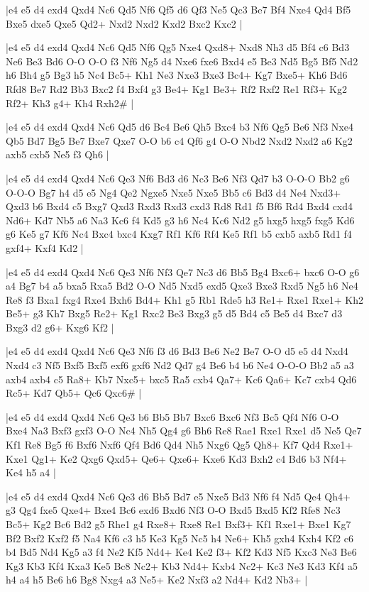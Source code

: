 \whitename{}
\blackname{}
\makegametitle
|e4 e5 d4 exd4 Qxd4 Nc6 Qd5 Nf6 Qf5 d6 Qf3 Ne5 Qc3 Be7 Bf4 Nxe4 Qd4 Bf5 Bxe5 dxe5 Qxe5 Qd2+ Nxd2 Nxd2 Kxd2 Bxc2 Kxc2  |

\whitename{}
\blackname{}
\makegametitle
|e4 e5 d4 exd4 Qxd4 Nc6 Qd5 Nf6 Qg5 Nxe4 Qxd8+ Nxd8 Nh3 d5 Bf4 c6 Bd3 Ne6 Be3 Bd6 O-O O-O f3 Nf6 Ng5 d4 Nxe6 fxe6 Bxd4 e5 Be3 Nd5 Bg5 Bf5 Nd2 h6 Bh4 g5 Bg3 h5 Nc4 Bc5+ Kh1 Ne3 Nxe3 Bxe3 Bc4+ Kg7 Bxe5+ Kh6 Bd6 Rfd8 Be7 Rd2 Bb3 Bxc2 f4 Bxf4 g3 Be4+ Kg1 Be3+ Rf2 Rxf2 Re1 Rf3+ Kg2 Rf2+ Kh3 g4+ Kh4 Rxh2\#  |

\whitename{}
\blackname{}
\makegametitle
|e4 e5 d4 exd4 Qxd4 Nc6 Qd5 d6 Bc4 Be6 Qh5 Bxc4 b3 Nf6 Qg5 Be6 Nf3 Nxe4 Qb5 Bd7 Bg5 Be7 Bxe7 Qxe7 O-O b6 c4 Qf6 g4 O-O Nbd2 Nxd2 Nxd2 a6 Kg2 axb5 cxb5 Ne5 f3 Qh6  |

\whitename{}
\blackname{}
\makegametitle
|e4 e5 d4 exd4 Qxd4 Nc6 Qe3 Nf6 Bd3 d6 Nc3 Be6 Nf3 Qd7 b3 O-O-O Bb2 g6 O-O-O Bg7 h4 d5 e5 Ng4 Qe2 Ngxe5 Nxe5 Nxe5 Bb5 c6 Bd3 d4 Ne4 Nxd3+ Qxd3 b6 Bxd4 c5 Bxg7 Qxd3 Rxd3 Rxd3 cxd3 Rd8 Rd1 f5 Bf6 Rd4 Bxd4 cxd4 Nd6+ Kd7 Nb5 a6 Na3 Kc6 f4 Kd5 g3 h6 Nc4 Kc6 Nd2 g5 hxg5 hxg5 fxg5 Kd6 g6 Ke5 g7 Kf6 Nc4 Bxc4 bxc4 Kxg7 Rf1 Kf6 Rf4 Ke5 Rf1 b5 cxb5 axb5 Rd1 f4 gxf4+ Kxf4 Kd2  |

\whitename{}
\blackname{}
\makegametitle
|e4 e5 d4 exd4 Qxd4 Nc6 Qe3 Nf6 Nf3 Qe7 Nc3 d6 Bb5 Bg4 Bxc6+ bxc6 O-O g6 a4 Bg7 b4 a5 bxa5 Rxa5 Bd2 O-O Nd5 Nxd5 exd5 Qxe3 Bxe3 Rxd5 Ng5 h6 Ne4 Re8 f3 Bxa1 fxg4 Rxe4 Bxh6 Bd4+ Kh1 g5 Rb1 Rde5 h3 Re1+ Rxe1 Rxe1+ Kh2 Be5+ g3 Kh7 Bxg5 Re2+ Kg1 Rxc2 Be3 Bxg3 g5 d5 Bd4 c5 Be5 d4 Bxc7 d3 Bxg3 d2 g6+ Kxg6 Kf2  |

\whitename{}
\blackname{}
\makegametitle
|e4 e5 d4 exd4 Qxd4 Nc6 Qe3 Nf6 f3 d6 Bd3 Be6 Ne2 Be7 O-O d5 e5 d4 Nxd4 Nxd4 c3 Nf5 Bxf5 Bxf5 exf6 gxf6 Nd2 Qd7 g4 Be6 b4 b6 Ne4 O-O-O Bb2 a5 a3 axb4 axb4 c5 Ra8+ Kb7 Nxc5+ bxc5 Ra5 cxb4 Qa7+ Kc6 Qa6+ Kc7 cxb4 Qd6 Rc5+ Kd7 Qb5+ Qc6 Qxc6\#  |

\whitename{}
\blackname{}
\makegametitle
|e4 e5 d4 exd4 Qxd4 Nc6 Qe3 b6 Bb5 Bb7 Bxc6 Bxc6 Nf3 Bc5 Qf4 Nf6 O-O Bxe4 Na3 Bxf3 gxf3 O-O Nc4 Nh5 Qg4 g6 Bh6 Re8 Rae1 Rxe1 Rxe1 d5 Ne5 Qe7 Kf1 Re8 Bg5 f6 Bxf6 Nxf6 Qf4 Bd6 Qd4 Nh5 Nxg6 Qg5 Qh8+ Kf7 Qd4 Rxe1+ Kxe1 Qg1+ Ke2 Qxg6 Qxd5+ Qe6+ Qxe6+ Kxe6 Kd3 Bxh2 c4 Bd6 b3 Nf4+ Ke4 h5 a4  |

\whitename{}
\blackname{}
\makegametitle
|e4 e5 d4 exd4 Qxd4 Nc6 Qe3 d6 Bb5 Bd7 e5 Nxe5 Bd3 Nf6 f4 Nd5 Qe4 Qh4+ g3 Qg4 fxe5 Qxe4+ Bxe4 Bc6 exd6 Bxd6 Nf3 O-O Bxd5 Bxd5 Kf2 Rfe8 Nc3 Bc5+ Kg2 Bc6 Bd2 g5 Rhe1 g4 Rxe8+ Rxe8 Re1 Bxf3+ Kf1 Rxe1+ Bxe1 Kg7 Bf2 Bxf2 Kxf2 f5 Na4 Kf6 c3 h5 Ke3 Kg5 Nc5 h4 Ne6+ Kh5 gxh4 Kxh4 Kf2 c6 b4 Bd5 Nd4 Kg5 a3 f4 Ne2 Kf5 Nd4+ Ke4 Ke2 f3+ Kf2 Kd3 Nf5 Kxc3 Ne3 Be6 Kg3 Kb3 Kf4 Kxa3 Ke5 Bc8 Nc2+ Kb3 Nd4+ Kxb4 Nc2+ Kc3 Ne3 Kd3 Kf4 a5 h4 a4 h5 Be6 h6 Bg8 Nxg4 a3 Ne5+ Ke2 Nxf3 a2 Nd4+ Kd2 Nb3+  |

